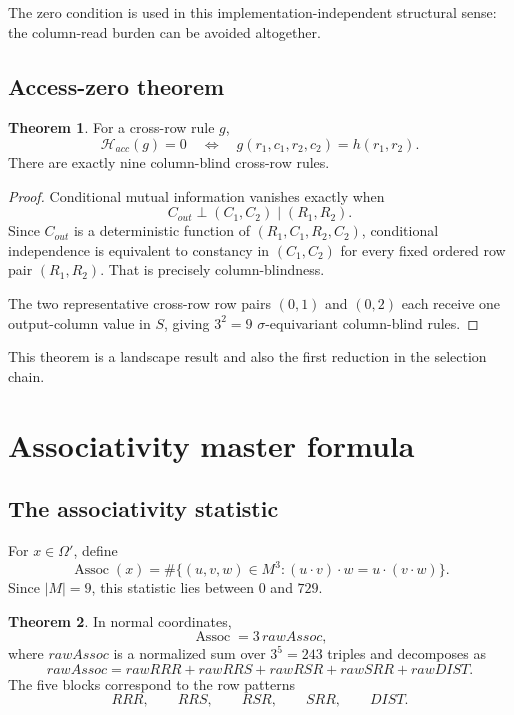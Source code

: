 \documentclass[11pt]{article}
\theoremstyle{definition}
\newtheorem{theorem}{Theorem}[section]
\begin{document}
The zero condition is used in this implementation-independent structural
sense: the column-read burden can be avoided altogether.

\subsection{Access-zero theorem}\label{access-zero-theorem}

\begin{theorem}
\label{thm:3.1}
For a cross-row rule \(g\), \[
\mathcal H_{acc}(g)=0
\quad\Longleftrightarrow\quad
 g(r_1,c_1,r_2,c_2)=h(r_1,r_2).
\] There are exactly nine column-blind cross-row rules.
\end{theorem}

\begin{proof}
Conditional mutual information vanishes exactly when \[
C_{out}\perp (C_1,C_2)\mid (R_1,R_2).
\] Since \(C_{out}\) is a deterministic function of
\((R_1,C_1,R_2,C_2)\), conditional independence is equivalent to
constancy in \((C_1,C_2)\) for every fixed ordered row pair
\((R_1,R_2)\). That is precisely column-blindness.

The two representative cross-row row pairs \((0,1)\) and \((0,2)\) each
receive one output-column value in \(S\), giving \(3^2=9\)
\(\sigma\)-equivariant column-blind rules.
\end{proof}

This theorem is a landscape result and also the first reduction in the
selection chain.

\section{Associativity master
formula}\label{associativity-master-formula}

\subsection{The associativity
statistic}\label{the-associativity-statistic}

For \(x\in\Omega'\), define \[
\operatorname{Assoc}(x)=
\#\{(u,v,w)\in M^3:(u\cdot v)\cdot w=u\cdot(v\cdot w)\}.
\] Since \(|M|=9\), this statistic lies between \(0\) and \(729\).

\begin{theorem}
\label{thm:4.1}
In normal coordinates, \[
\operatorname{Assoc}=3\,rawAssoc,
\] where \(rawAssoc\) is a normalized sum over \(3^5=243\) triples and
decomposes as \[
rawAssoc=rawRRR+rawRRS+rawRSR+rawSRR+rawDIST.
\] The five blocks correspond to the row patterns \[
RRR,
\qquad RRS,
\qquad RSR,
\qquad SRR,
\qquad DIST.
\]
\end{theorem}
\end{document}
